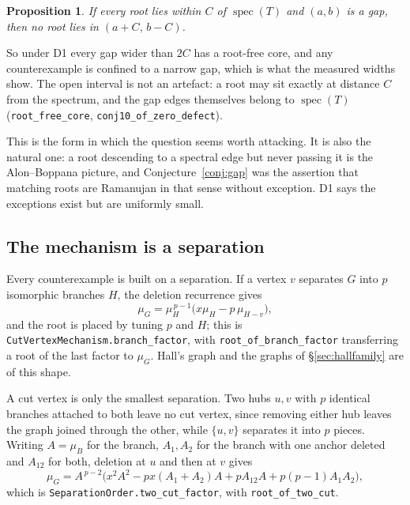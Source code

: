 \documentclass[11pt]{article}
\newtheorem{proposition}[theorem]{Proposition}
\theoremstyle{remark}
\begin{document}
\begin{proposition}\label{prop:core}
If every root lies within $C$ of $\operatorname{spec}(T)$ and $(a,b)$ is a gap, then no root
lies in $(a+C,\,b-C)$.
\end{proposition}

So under D1 every gap wider than $2C$ has a root-free core, and any counterexample is confined
to a narrow gap, which is what the measured widths show. The open interval is not an artefact:
a root may sit exactly at distance $C$ from the spectrum, and the gap edges themselves belong
to $\operatorname{spec}(T)$ (\texttt{root\_free\_core}, \texttt{conj10\_of\_zero\_defect}).

This is the form in which the question seems worth attacking. It is also the natural one: a
root descending to a spectral edge but never passing it is the Alon--Boppana picture, and
Conjecture~\ref{conj:gap} was the assertion that matching roots are Ramanujan in that sense
without exception. D1 says the exceptions exist but are uniformly small.

\subsection{The mechanism is a separation}\label{sec:mechanism}

Every counterexample is built on a separation. If a vertex $v$ separates $G$ into $p$ isomorphic
branches $H$, the deletion recurrence gives
\begin{equation}\label{eq:branch}
   \mu_G=\mu_H^{\,p-1}\bigl(x\mu_H-p\,\mu_{H-v}\bigr),
\end{equation}
and the root is placed by tuning $p$ and $H$; this is
\texttt{CutVertexMechanism.branch\_factor}, with \texttt{root\_of\_branch\_factor} transferring
a root of the last factor to $\mu_G$. Hall's graph and the graphs of
\S\ref{sec:hallfamily} are of this shape.

A cut vertex is only the smallest separation. Two hubs $u,v$ with $p$ identical branches
attached to both leave no cut vertex, since removing either hub leaves the graph joined through
the other, while $\{u,v\}$ separates it into $p$ pieces. Writing $A=\mu_B$ for the branch,
$A_1,A_2$ for the branch with one anchor deleted and $A_{12}$ for both, deletion at $u$ and then
at $v$ gives
\begin{equation}\label{eq:twocut}
   \mu_G=A^{\,p-2}\bigl(x^2A^2-px(A_1+A_2)A+pA_{12}A+p(p-1)A_1A_2\bigr),
\end{equation}
which is \texttt{SeparationOrder.two\_cut\_factor}, with \texttt{root\_of\_two\_cut}.
\end{document}
